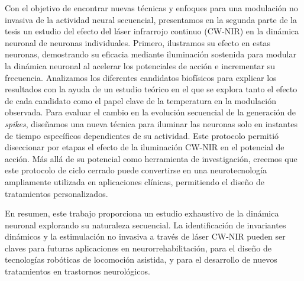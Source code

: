 Con el objetivo de encontrar nuevas técnicas y enfoques para una modulación no invasiva de la actividad neural secuencial, presentamos en la segunda parte de la tesis un estudio del efecto del láser infrarrojo continuo (CW-NIR) en la dinámica neuronal de neuronas individuales. Primero, ilustramos su efecto en estas neuronas, demostrando su eficacia mediante iluminación sostenida para modular la dinámica neuronal al acelerar los potenciales de acción e incrementar su frecuencia. Analizamos los diferentes candidatos biofísicos para explicar los resultados con la ayuda de un estudio teórico en el que se explora tanto el efecto de cada candidato como el papel clave de la temperatura en la modulación observada. Para evaluar el cambio en la evolución secuencial de la generación de \textit{spikes}, diseñamos una nueva técnica para iluminar las neuronas solo en instantes de tiempo específicos dependientes de su actividad. Este protocolo permitió diseccionar por etapas el efecto de la iluminación CW-NIR en el potencial de acción. Más allá de su potencial como herramienta de investigación, creemos que este protocolo de ciclo cerrado puede convertirse en una neurotecnología ampliamente utilizada en aplicaciones clínicas, permitiendo el diseño de tratamientos personalizados.

En resumen, este trabajo proporciona un estudio exhaustivo de la dinámica neuronal explorando su naturaleza secuencial. La identificación de invariantes dinámicos y la estimulación no invasiva a través de láser CW-NIR pueden ser claves para futuras aplicaciones en neurorrehabilitación, para el diseño de tecnologías robóticas de locomoción asistida, y para el desarrollo de nuevos tratamientos en trastornos neurológicos.